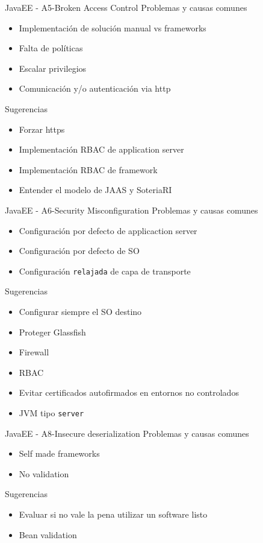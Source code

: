 \documentclass{beamer}
\begin{document}
\begin{frame}{JavaEE - A5-Broken Access Control}
Problemas y causas comunes
\begin{itemize}
\item Implementación de solución manual vs frameworks
\item Falta de políticas 
\item Escalar privilegios
\item Comunicación y/o autenticación via http
\end{itemize}

Sugerencias
\begin{itemize}
\item Forzar https
\item Implementación RBAC de application server
\item Implementación RBAC de framework
\item Entender el modelo de JAAS y SoteriaRI
\end{itemize}
\end{frame}



\begin{frame}{JavaEE - A6-Security Misconfiguration}
Problemas y causas comunes
\begin{itemize}
	\item Configuración por defecto de applicaction server
	\item Configuración por defecto de SO
	\item Configuración \texttt{relajada} de capa de transporte
\end{itemize}

Sugerencias
\begin{itemize}
	\item Configurar siempre el SO destino
	\item Proteger Glassfish
	\item Firewall
	\item RBAC
	\item Evitar certificados autofirmados en entornos no controlados
	\item JVM tipo \texttt{server}
\end{itemize}
\end{frame}


\begin{frame}{JavaEE - A8-Insecure deserialization}
Problemas y causas comunes
\begin{itemize}
	\item Self made frameworks
	\item No validation
\end{itemize}

Sugerencias
\begin{itemize}
	\item Evaluar si no vale la pena utilizar un software listo
	\item Bean validation
\end{itemize}
\end{frame}
\end{document}
